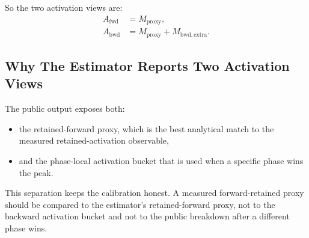 So the two activation views are:
\begin{align*}
A_{\mathrm{fwd}} &= M_{\mathrm{proxy}}, \\
A_{\mathrm{bwd}} &= M_{\mathrm{proxy}} + M_{\mathrm{bwd,extra}}.
\end{align*}

\subsection{Why The Estimator Reports Two Activation Views}
The public output exposes both:
\begin{itemize}[leftmargin=1.5em]
\item the retained-forward proxy, which is the best analytical match to the
measured retained-activation observable,
\item and the phase-local activation bucket that is used when a specific phase
wins the peak.
\end{itemize}

This separation keeps the calibration honest. A measured forward-retained proxy
should be compared to the estimator's retained-forward proxy, not to the
backward activation bucket and not to the public breakdown after a different
phase wins.
